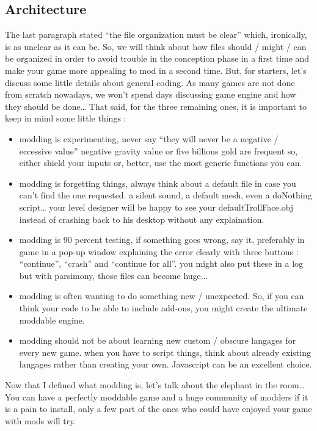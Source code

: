 \documentclass[a4paper,11pt]{article}
\begin{document}
\subsection{Architecture}
The last paragraph stated “the file organization must be clear” which, ironically, is as unclear as it can be. So, we will think about how files should / might / can be organized in order to avoid trouble in the conception phase in a first time and make your game more appealing to mod in a second time. But, for starters, let’s discuss some little details about general coding.
As many games are not done from scratch nowadays, we won’t spend days discussing game engine and how they should be done… That said, for the three remaining ones, it is important to keep in mind some little things :
\begin{itemize}
\item modding is experimenting, never say “they will never be a negative / eccessive value” negative gravity value or five billions gold are frequent so, either shield your inputs or, better, use the most generic functions you can.
\item modding is forgetting things, always think about a default file in case you can’t find the one requested. a silent sound, a default mesh, even a doNothing script… your level designer will be happy to see your defaultTrollFace.obj instead of crashing back to his desktop without any explaination.
\item modding is 90 percent testing, if something goes wrong, say it, preferably in game in a pop-up window explaining the error clearly with three buttons : “continue”, “crash” and “continue for all”. you might also put these in a log but with parsimony, those files can become huge...
\item modding is often wanting to do something new / unexpected. So, if you can think your code to be able to include add-ons, you might create the ultimate moddable engine.
\item modding should not be about learning new custom / obscure langages for every new game. when you have to script things, think about already existing langages rather than creating your own. Javascript can be an excellent choice.
\end{itemize}
Now that I defined what modding is, let’s talk about the elephant in the room… You can have a perfectly moddable game and a huge community of modders if it is a pain to install, only a few part of the ones who could have enjoyed your game with mods will try.
\end{document}
